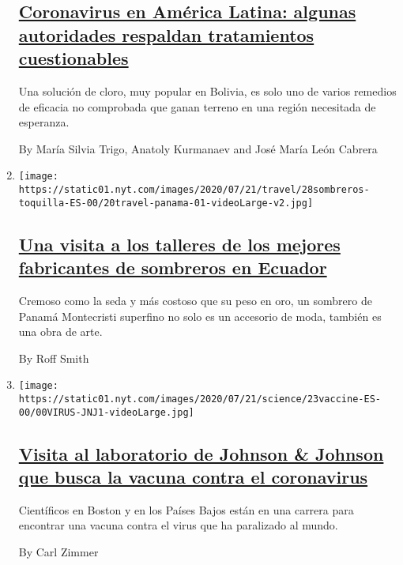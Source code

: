 \begin{enumerate}
  \hypertarget{coronavirus-en-amuxe9rica-latina-algunas-autoridades-respaldan-tratamientos-cuestionables}{%
  \subsection{\texorpdfstring{\href{/es/2020/07/23/espanol/america-latina/bolivia-cloro-coronavirus-ivermectina.html}{Coronavirus
  en América Latina: algunas autoridades respaldan tratamientos
  cuestionables}}{Coronavirus en América Latina: algunas autoridades respaldan tratamientos cuestionables}}\label{coronavirus-en-amuxe9rica-latina-algunas-autoridades-respaldan-tratamientos-cuestionables}}

  Una solución de cloro, muy popular en Bolivia, es solo uno de varios
  remedios de eficacia no comprobada que ganan terreno en una región
  necesitada de esperanza.

  By María Silvia Trigo, Anatoly Kurmanaev and José María León Cabrera
\item
  \texttt{[image: https://static01.nyt.com/images/2020/07/21/travel/28sombreros-toquilla-ES-00/20travel-panama-01-videoLarge-v2.jpg]}

  \hypertarget{una-visita-a-los-talleres-de-los-mejores-fabricantes-de-sombreros-en-ecuador}{%
  \subsection{\texorpdfstring{\href{/es/2020/07/28/espanol/estilos-de-vida/sombreros-toquilla-panama-ecuador.html}{Una
  visita a los talleres de los mejores fabricantes de sombreros en
  Ecuador}}{Una visita a los talleres de los mejores fabricantes de sombreros en Ecuador}}\label{una-visita-a-los-talleres-de-los-mejores-fabricantes-de-sombreros-en-ecuador}}

  Cremoso como la seda y más costoso que su peso en oro, un sombrero de
  Panamá Montecristi superfino no solo es un accesorio de moda, también
  es una obra de arte.

  By Roff Smith
\item
  \texttt{[image: https://static01.nyt.com/images/2020/07/21/science/23vaccine-ES-00/00VIRUS-JNJ1-videoLarge.jpg]}

  \hypertarget{visita-al-laboratorio-de-johnson--johnson-que-busca-la-vacuna-contra-el-coronavirus}{%
  \subsection{\texorpdfstring{\href{/es/2020/07/23/espanol/ciencia-y-tecnologia/vacuna-coronavirus.html}{Visita
  al laboratorio de Johnson \& Johnson que busca la vacuna contra el
  coronavirus}}{Visita al laboratorio de Johnson \& Johnson que busca la vacuna contra el coronavirus}}\label{visita-al-laboratorio-de-johnson--johnson-que-busca-la-vacuna-contra-el-coronavirus}}

  Científicos en Boston y en los Países Bajos están en una carrera para
  encontrar una vacuna contra el virus que ha paralizado al mundo.

  By Carl Zimmer
\end{enumerate}

